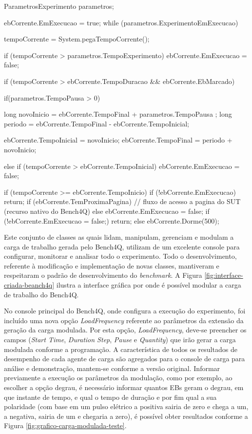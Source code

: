 \begin{codigo}[caption={Algoritmo de geração de carga modificado para modulaçao}, label={code:modelworkload}, breaklines=false]
ParametrosExperimento parametros;
	
ebCorrente.EmExecucao = true;
while (parametros.ExperimentoEmExecucao) {
		
	tempoCorrente = System.pegaTempoCorrente();
	
	if (tempoCorrente > parametros.TempoExperimento){
		ebCorrente.EmExecucao = false;
	}
	
	if (tempoCorrente > ebCorrente.TempoDuracao && ebCorrente.EbMarcado) {
		if(parametros.TempoPausa > 0){
			
			long novoInicio = ebCorrente.TempoFinal + parametros.TempoPausa ;
			long periodo = ebCorrente.TempoFinal - ebCorrente.TempoInicial;
			
			ebCorrente.TempoInicial = novoInicio;
			ebCorrente.TempoFinal = periodo + novoInicio;
		} else if (tempoCorrente > ebCorrente.TempoInicial) {
			ebCorrente.EmExecucao = false;
		}
	}

	if (tempoCorrente >= ebCorrente.TempoInicio) {
		if (!ebCorrente.EmExecucao) {
			return;
		}
		if (ebCorrente.TemProximaPagina) {
			// fluxo de acesso a pagina do SUT (recurso nativo do Bench4Q)
		} else {
			ebCorrente.EmExecucao = false;
		}	
		if (!ebCorrente.EmExecucao = false;) {
			return;
		}	
	} else {
		ebCorrente.Dorme(500);				
	}

}

\end{codigo}


Este conjunto de classes as quais lidam, manipulam, gerenciam e modulam a carga de trabalho gerada pelo Bench4Q, utilizam de um excelente console para configurar, monitorar e analisar todo o experimento. Todo o desenvolvimento, referente à modificação e implementação de novas classes, mantiveram e respeitaram o padrão de desenvolvimento do \textit{benchmark}. A Figura \ref{fig:interface-criada-beanch4q} ilustra a interface gráfica por onde é possível modular a carga de trabalho do Bench4Q. 


No console principal do Bench4Q, onde configura a execução do experimento, foi incluído uma nova opção \textit{LoadFrequency} referente ao parâmetros da extensão da geração da carga modulada. Por esta opção, \textit{LoadFrequency}, deve-se preencher os campos (\textit{Start Time}, \textit{Duration Step}, \textit{Pause} e \textit{Quantity}) que irão gerar a carga modulada conforme a programação. A característica de todos os resultados de desempenho de cada agente de carga são agregados para o console de carga para análise e demonstração, mantem-se conforme a versão original.
Informar previamente a execução os parâmetros da modulação, como por exemplo, ao escolher a opção degrau, é necessário informar quantos EBs geram o degrau, em que instante de tempo, e qual o tempo de duração e por fim qual a sua polaridade (com base em um pulso elétrico a positiva sairia de zero e chega a um, a negativa, sairia de um e chegaria a zero), é possível obter resultados conforme a Figura \ref{fig:grafico-carga-modulada-teste}.

